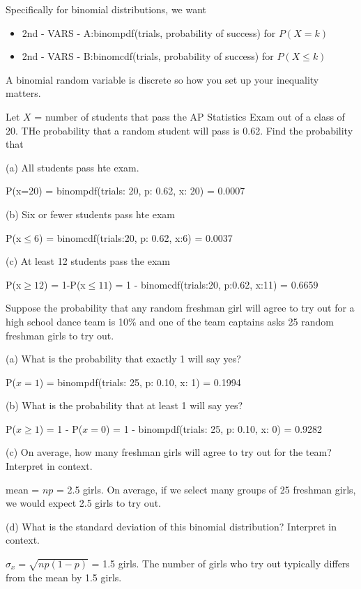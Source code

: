 \documentclass[../stats.tex]{subfiles}
\begin{document}
Specifically for binomial distributions, we want
\begin{itemize}
    \item 2nd - VARS - A:binompdf(trials, probability of success) for $P(X=k)$
    \item 2nd - VARS - B:binomcdf(trials, probability of success) for $P(X\leq k)$
\end{itemize}
A binomial random variable is discrete so how you set up your inequality matters.

\begin{example}
    Let $X$ = number of students that pass the AP Statistics Exam out of a class of 20. THe probability that a random student will pass is 0.62. Find the probability that 

    (a) All students pass hte exam.

    P(x=20) = binompdf(trials: 20, p: 0.62, x: 20) = 0.0007

    (b) Six or fewer students pass hte exam 

    P(x$\leq 6$) = binomcdf(trials:20, p: 0.62, x:6) = 0.0037

    (c) At least 12 students pass the exam 

    P(x$\geq 12$) = 1-P(x$\leq 11$) = 1 - binomcdf(trials:20, p:0.62, x:11) = 0.6659
\end{example}

\begin{example}
    Suppose the probability that any random freshman girl will agree to try out for a high school dance team is 10\% and one of the team captains asks 25 random freshman girls to try out.

    (a) What is the probability that exactly 1 will say yes?

    P($x=1$) = binompdf(trials: 25, p: 0.10, x: 1) = 0.1994

    (b) What is the probability that at least 1 will say yes?

    P($x\geq 1$) = 1 - P($x=0$) = 1 - binompdf(trials: 25, p: 0.10, x: 0) = 0.9282

    (c) On average, how many freshman girls will agree to try out for the team? Interpret in context.

    mean = $np$ = 2.5 girls. On average, if we select many groups of 25 freshman girls, we would expect 2.5 girls to try out.

    (d) What is the standard deviation of this binomial distribution? Interpret in context.

    $\sigma_x = \sqrt{np(1-p)}$ = 1.5 girls. The number of girls who try out typically differs from the mean by 1.5 girls.
\end{example}
\end{document}
